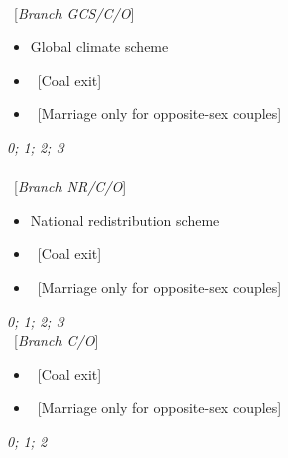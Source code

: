 \documentclass[12pt,english]{article}
\begin{document}
\begin{enumerate}[resume]
\\
~[\textit{Branch GCS/C/O}] \\
\begin{itemize}  \vspace{-1em}
    \item Global climate scheme 
    \item ~[Coal exit]  
    \item ~[Marriage only for opposite-sex couples]
\end{itemize}
\textit{0; 1; 2; 3}\\
\\
~[\textit{Branch NR/C/O}] \\
\begin{itemize}  \vspace{-1em}
    \item National redistribution scheme 
    \item ~[Coal exit]  
    \item ~[Marriage only for opposite-sex couples]
\end{itemize}
\textit{0; 1; 2; 3}
\\
~[\textit{Branch C/O}] \\
\begin{itemize}  \vspace{-1em}
    \item ~[Coal exit]  
    \item ~[Marriage only for opposite-sex couples]
\end{itemize}
\textit{0; 1; 2}\\
\end{enumerate}
\end{document}
